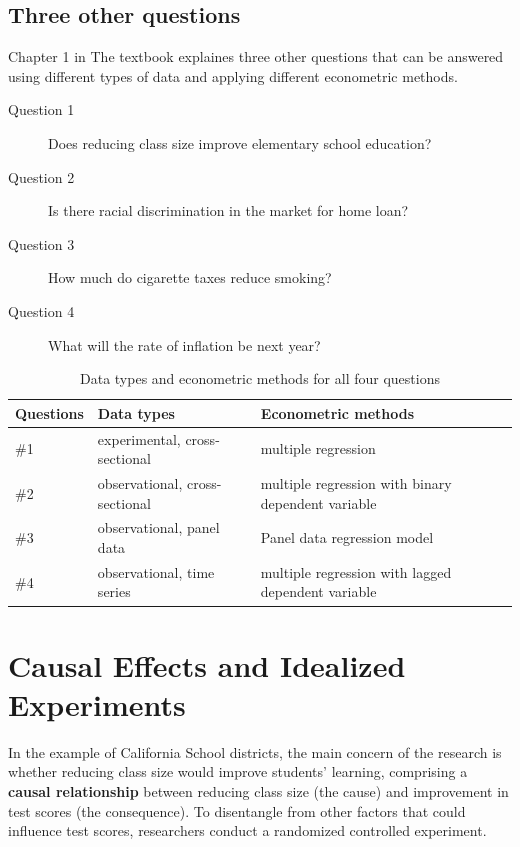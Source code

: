 \documentclass[a4paper,11pt]{article}
\begin{document}
\subsection*{Three other questions}
\label{sec:orga5aebf8}

Chapter 1 in The textbook explaines three other questions that can be
answered using different types of data and applying different
econometric methods.

\begin{description}
\item[{Question 1}] Does reducing class size improve elementary school education?
\item[{Question 2}] Is there racial discrimination in the market for home loan?
\item[{Question 3}] How much do cigarette taxes reduce smoking?
\item[{Question 4}] What will the rate of inflation be next year?
\end{description}

\begin{table}[htbp]
\caption{\label{tab:org4392faf}
Data types and econometric methods for all four questions}
\centering
\begin{tabular}{lll}
Questions & Data types & Econometric methods\\
\hline
\#1 & experimental, cross-sectional & multiple regression\\
\#2 & observational, cross-sectional & multiple regression with binary dependent variable\\
\#3 & observational, panel data & Panel data regression model\\
\#4 & observational, time series & multiple regression with lagged dependent variable\\
\end{tabular}
\end{table}


\section{Causal Effects and Idealized Experiments}
\label{sec:orga436fb7}

In the example of California School districts, the main concern of the
research is whether reducing class size would improve students'
learning, comprising a \textbf{causal relationship} between reducing class
size (the cause) and improvement in test scores (the consequence). To
disentangle from other factors that could influence test scores,
researchers conduct a randomized controlled experiment. 
\end{document}
